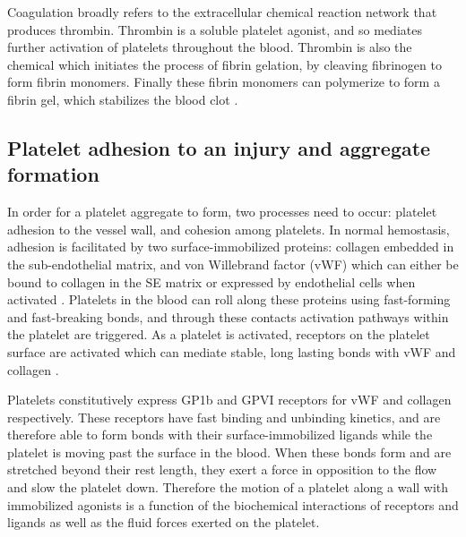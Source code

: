 Coagulation broadly refers to the extracellular chemical reaction
network that produces thrombin. Thrombin is a soluble platelet
agonist, and so mediates further activation of platelets throughout
the blood. Thrombin is also the chemical which initiates the process
of fibrin gelation, by cleaving fibrinogen to form fibrin
monomers. Finally these fibrin monomers can polymerize to form a
fibrin gel, which stabilizes the blood clot \cite{Fogelson2015}. 


\subsection{Platelet adhesion to an injury and aggregate formation}
\label{sec:platelet-adhesion}

In order for a platelet aggregate to form, two processes need to
occur: platelet adhesion to the vessel wall, and cohesion among
platelets. In normal hemostasis, adhesion is facilitated by two
surface-immobilized proteins: collagen embedded in the sub-endothelial
matrix, and von Willebrand factor (vWF) which can either be bound to
collagen in the SE matrix or expressed by endothelial cells when
activated \cite{Fogelson2015}. Platelets in the blood can roll along
these proteins using fast-forming and fast-breaking bonds, and through
these contacts activation pathways within the platelet are
triggered. As a platelet is activated, receptors on the platelet
surface are activated which can mediate stable, long lasting bonds
with vWF and collagen \cite{Bye2016,Li2010,Fogelson2015,Qiu2015}. 
		
Platelets constitutively express GP1b and GPVI receptors for vWF and
collagen respectively. These receptors have fast binding and unbinding
kinetics, and are therefore able to form bonds with their
surface-immobilized ligands while the platelet is moving past the
surface in the blood. When these bonds form and are stretched beyond
their rest length, they exert a force in opposition to the flow and
slow the platelet down. Therefore the motion of a platelet along a
wall with immobilized agonists is a function of the biochemical
interactions of receptors and ligands as well as the fluid forces
exerted on the platelet.
		
